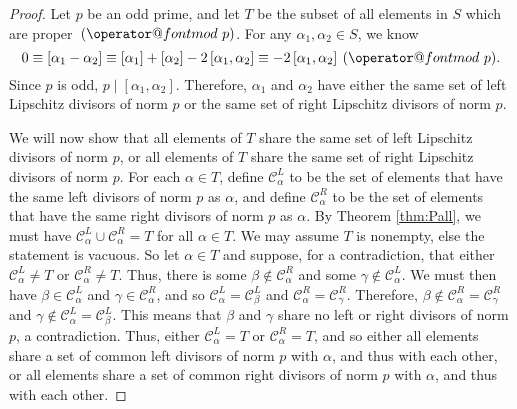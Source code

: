 \documentclass[10pt]{amsart}
\makeatletter
\newcommand{\norm}[1]{\left[#1\right]}
\DeclareRobustCommand{\pmod}{\@pmods}
\def\@pmods#1{\mkern4mu({\operator@font mod}\mkern 6mu#1)}
\makeatother
\begin{document}
\begin{proof}
\begin{comment}
First, suppose $p \neq 2$.  We begin with the case $n=2$.  Since
$$0 \equiv \norm{\alpha_1 - \alpha_2} \equiv \norm{\alpha_1} + \norm{\alpha_2} - 2\norm{\alpha_1, \alpha_2} \equiv -2 \norm{\alpha_1,\alpha_2} \pmod{p},$$
and $p$ is odd, we know $p \mid \norm{\alpha_1, \alpha_2}$.  So the result follows from Theorem 4.  For the inductive step, we may assume $n \geq 3$ and that $\alpha_1, \dots , \alpha_{n-1}$ share either the same set of left or right divisors of norm $p$.  Assume WLOG they share the same left set.  If $\alpha_n$ shares a set of left divisors with any of them, then it shares this set with all of them.  If this does not hold, then $\alpha_n$ shares a set of right divisors with all of them instead, and again we have our result.
\end{comment}

Let $p$ be an odd prime, and let $T$ be the subset of all elements in $S$ which are proper $\pmod{p}$.  For any $\alpha_1, \alpha_2 \in S$, we know
$$
0 \equiv \norm{\alpha_1 - \alpha_2} \equiv \norm{\alpha_1} + \norm{\alpha_2} - 2\norm{\alpha_1, \alpha_2} \equiv -2 \norm{\alpha_1,\alpha_2} \pmod{p}.
$$
Since $p$ is odd, $p \mid \norm{\alpha_1, \alpha_2}$.  Therefore, $\alpha_1$ and $\alpha_2$ have either the same set of left Lipschitz divisors of norm $p$ or the same set of right Lipschitz divisors of norm $p$.

We will now show that all elements of $T$ share the same set of left Lipschitz divisors of norm $p$, or all elements of $T$ share the same set of right Lipschitz divisors of norm $p$.  For each $\alpha \in T$, define $\mathcal{C}_\alpha^L$ to be the set of elements that have the same left divisors of norm $p$ as $\alpha$, and define $\mathcal{C}_\alpha^R$ to be the set of elements that have the same right divisors of norm $p$ as $\alpha$.  By Theorem \ref{thm:Pall}, we must have $\mathcal{C}_\alpha^L \cup \mathcal{C}_\alpha^R = T$ for all $\alpha \in T$. We may assume $T$ is nonempty, else the statement is vacuous.  So let $\alpha \in T$ and suppose, for a contradiction, that either $\mathcal{C}_\alpha^L \neq T$ or $\mathcal{C}_\alpha^R \neq T$.  Thus, there is some $\beta \not \in \mathcal{C}_\alpha^R$ and some $\gamma \not \in \mathcal{C}_\alpha^L$.  We must then have $\beta \in \mathcal{C}_\alpha^L$ and $\gamma \in \mathcal{C}_\alpha^R$, and so $\mathcal{C}_\alpha^L = \mathcal{C}_\beta^L$ and $\mathcal{C}_\alpha^R = \mathcal{C}_\gamma^R$.  Therefore, $\beta \not \in \mathcal{C}_\alpha^R = \mathcal{C}_\gamma^R$ and $\gamma \not \in \mathcal{C}_\alpha^L = \mathcal{C}_\beta^L$.  This means that $\beta$ and $\gamma$ share no left or right divisors of norm $p$, a contradiction.  Thus, either $\mathcal{C}_\alpha^L = T$ or $\mathcal{C}_\alpha^R = T$, and so either all elements share a set of common left divisors of norm $p$ with $\alpha$, and thus with each other, or all elements share a set of common right divisors of norm $p$ with $\alpha$, and thus with each other.


\end{proof}
\end{document}
